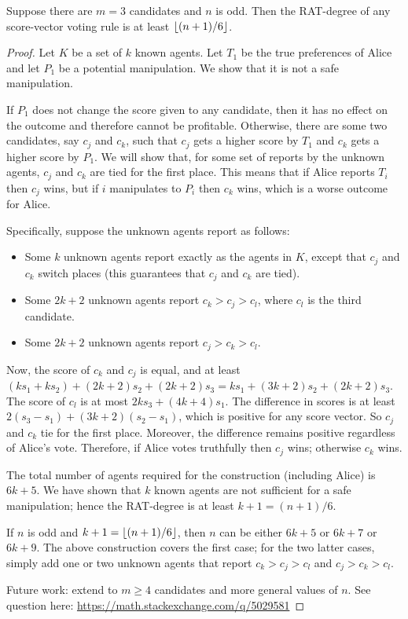 \begin{proposition}\label{lower:score-voting-old}
Suppose there are $m=3$ candidates
and $n$ is odd. 
Then the RAT-degree of any score-vector voting rule is at least $
\left\lfloor (n+1)/6 \right\rfloor$.
\end{proposition}
\begin{proof}
Let $K$ be a set of $k$ known agents.
Let $T_1$ be the true preferences of Alice and let $P_1$ be a potential manipulation. We show that it is not a safe manipulation.

If $P_1$ does not change the score given to any candidate, then it has no effect on the outcome and therefore cannot be profitable.
Otherwise, there are some two candidates, say $c_j$ and $c_k$, such that $c_j$ gets a higher score by $T_1$ and $c_k$ gets a higher score by $P_1$. We will show that, for some set of reports by the unknown agents, $c_j$ and $c_k$ are tied for the first place. This means that if Alice reports $T_i$ then $c_j$ wins, but if $i$ manipulates to $P_i$ then $c_k$ wins, which is a worse outcome for Alice.

Specifically, suppose the unknown agents report as follows:
\begin{itemize}
\item Some $k$ unknown agents report exactly as the agents in $K$, except that $c_j$ and $c_k$ switch places (this guarantees that $c_j$ and $c_k$ are tied).
\item Some $2 k + 2$ unknown agents report $c_k > c_j > c_l$, where $c_l$ is the third candidate.
\item Some $2 k + 2$ unknown agents report $c_j > c_k > c_l$.
\end{itemize}
Now, the score of $c_k$ and $c_j$ is equal, and at least $(k s_1 + k s_2) + (2 k+2) s_2 + (2 k+2) s_3 = k s_1 + (3 k +2) s_2 + (2 k + 2)s_3$. The score of $c_l$ is at most $2 k s_3 + (4 k + 4) s_1$.
The difference in scores is at least $2 (s_3-s_1) + (3k + 2)(s_2-s_1)$, which is positive for any score vector. So $c_j$ and $c_k$ tie for the first place. Moreover, the difference remains positive regardless of Alice's vote. Therefore, if Alice votes truthfully then $c_j$ wins; otherwise $c_k$ wins. 

The total number of agents required for the construction (including Alice) is $6 k + 5$. We have shown that $k$ known agents are not sufficient for a safe manipulation; hence the RAT-degree is at least $k+1 = (n+1)/6$.

If $n$ is odd and $k+1 = \left\lfloor (n+1)/6 \right\rfloor$, then $n$ can be either $6k+5$ or $6k+7$ or $6k+9$. The above construction covers the first case; for the two latter cases, simply add one or two unknown agents that report $c_k > c_j > c_l$ and $c_j > c_k > c_l$.

Future work: extend to $m\geq 4$ candidates and more general values of $n$. See question here: \url{https://math.stackexchange.com/q/5029581}
\end{proof}

